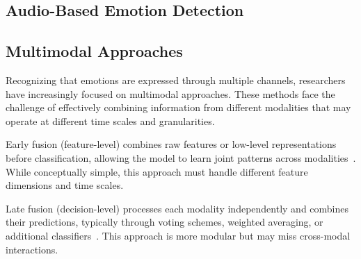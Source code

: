 \documentclass[12pt]{article}
\begin{document}
\subsection{Audio-Based Emotion Detection}




\subsection{Multimodal Approaches}
Recognizing that emotions are expressed through multiple channels, researchers have increasingly focused on multimodal approaches. These methods face the challenge of effectively combining information from different modalities that may operate at different time scales and granularities.

Early fusion (feature-level) combines raw features or low-level representations before classification, allowing the model to learn joint patterns across modalities~\cite{poria2017review}. While conceptually simple, this approach must handle different feature dimensions and time scales.

Late fusion (decision-level) processes each modality independently and combines their predictions, typically through voting schemes, weighted averaging, or additional classifiers~\cite{wagner2011introducting}. This approach is more modular but may miss cross-modal interactions.
\end{document}
